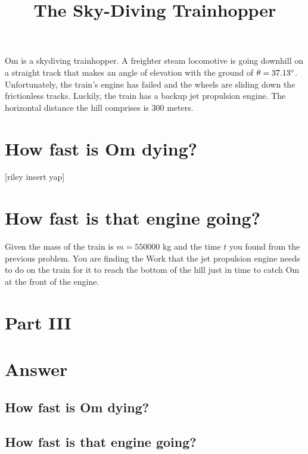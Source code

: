 \documentclass{article}
\title{\vspace{-3em}The Sky-Diving Trainhopper\vspace{-3em}}
\begin{document}
\fontsize{14}{16}\selectfont

\maketitle

Om is a skydiving trainhopper. A freighter steam locomotive is going downhill on a straight track that makes an angle of elevation with the ground of $\theta=37.13\degree$. Unfortunately, the train's engine has failed and the wheels are sliding down the frictionless tracks. Luckily, the train has a backup jet propulsion engine. The horizontal distance the hill comprises is 300 meters.

\section{How fast is Om dying?}
[riley insert yap]

\section{How fast is that engine going?}
Given the mass of the train is $m=550000$ kg and the time $t$ you found from the previous problem. You are finding the Work that the jet propulsion engine needs to do on the train for it to reach the bottom of the hill just in time to catch Om at the front of the engine.

\section{Part III}

\pagebreak

\section{Answer}

\subsection{How fast is Om dying?}

\subsection{How fast is that engine going?}

\end{document}
